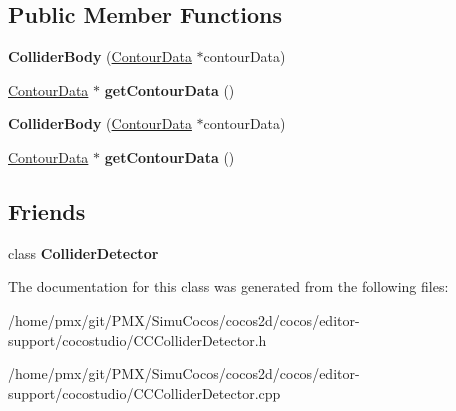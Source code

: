 \subsection*{Public Member Functions}
\begin{DoxyCompactItemize}
\item 
\mbox{\label{classcocostudio_1_1ColliderBody_a8d5e8292691429ea59e64c70a90e948e}} 
{\bfseries Collider\+Body} (\hyperlink{classcocostudio_1_1ContourData}{Contour\+Data} $\ast$contour\+Data)
\item 
\mbox{\label{classcocostudio_1_1ColliderBody_aac77019db15e04240dff38ef27d9de5d}} 
\hyperlink{classcocostudio_1_1ContourData}{Contour\+Data} $\ast$ {\bfseries get\+Contour\+Data} ()
\item 
\mbox{\label{classcocostudio_1_1ColliderBody_a8d5e8292691429ea59e64c70a90e948e}} 
{\bfseries Collider\+Body} (\hyperlink{classcocostudio_1_1ContourData}{Contour\+Data} $\ast$contour\+Data)
\item 
\mbox{\label{classcocostudio_1_1ColliderBody_aac77019db15e04240dff38ef27d9de5d}} 
\hyperlink{classcocostudio_1_1ContourData}{Contour\+Data} $\ast$ {\bfseries get\+Contour\+Data} ()
\end{DoxyCompactItemize}
\subsection*{Friends}
\begin{DoxyCompactItemize}
\item 
\mbox{\label{classcocostudio_1_1ColliderBody_a64b7449b5d3dac5e91a961e26dc2481f}} 
class {\bfseries Collider\+Detector}
\end{DoxyCompactItemize}


The documentation for this class was generated from the following files\+:\begin{DoxyCompactItemize}
\item 
/home/pmx/git/\+P\+M\+X/\+Simu\+Cocos/cocos2d/cocos/editor-\/support/cocostudio/C\+C\+Collider\+Detector.\+h\item 
/home/pmx/git/\+P\+M\+X/\+Simu\+Cocos/cocos2d/cocos/editor-\/support/cocostudio/C\+C\+Collider\+Detector.\+cpp\end{DoxyCompactItemize}
